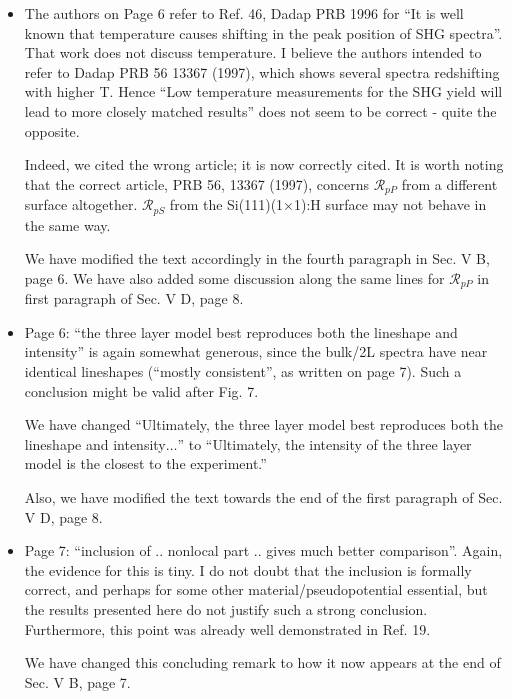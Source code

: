 \documentclass[11pt]{article}
\begin{document}
\begin{enumerate}
\begin{itemize}
\item
The authors on Page 6 refer to Ref. 46, Dadap PRB 1996 for ``It is well known
that temperature causes shifting in the peak position of SHG spectra''. That
work does not discuss temperature. I believe the authors intended to refer to
Dadap PRB 56 13367 (1997), which shows several spectra redshifting with higher
T. Hence ``Low temperature measurements for the SHG yield will lead to more
closely matched results'' does not seem to be correct - quite the opposite.
\begin{shaded}\label{ref1.03}
Indeed, we cited the wrong article; it is now correctly cited. It is worth
noting that the correct article, PRB 56, 13367 (1997), concerns
$\mathcal{R}_{pP}$ from a different surface altogether. $\mathcal{R}_{pS}$ from
the Si(111)(1$\times$1):H surface may not behave in the same way.
 
We have modified the text accordingly in the fourth paragraph in Sec. V B, page
6. We have also added some discussion along the same lines for
$\mathcal{R}_{pP}$ in first paragraph of Sec. V D, page 8.
\end{shaded}

\item
Page 6: ``the three layer model best reproduces both the lineshape and 
intensity'' is again somewhat generous, since the bulk/2L spectra have near
identical lineshapes (``mostly consistent'', as written on page 7). Such a
conclusion might be valid after Fig. 7.
\begin{shaded}\label{ref1.04}
We have changed ``Ultimately, the three layer model best reproduces both the
lineshape and intensity$\dots$'' to ``Ultimately, the intensity of the three
layer model is the closest to the experiment.''

Also, we have modified the text towards the end of the first paragraph of Sec. V
D, page 8.
\end{shaded}

\item
Page 7: ``inclusion of .. nonlocal part .. gives much better comparison''.
Again, the evidence for this is tiny. I do not doubt that the inclusion is
formally correct, and perhaps for some other material/pseudopotential essential,
but the results presented here do not justify such a strong conclusion.
Furthermore, this point was already well demonstrated in Ref. 19.
\begin{shaded}\label{ref1.05}
We have changed this concluding remark to how it now appears at the end of Sec.
V B, page 7.
\end{shaded}


\end{itemize}
\end{enumerate}
\end{document}
